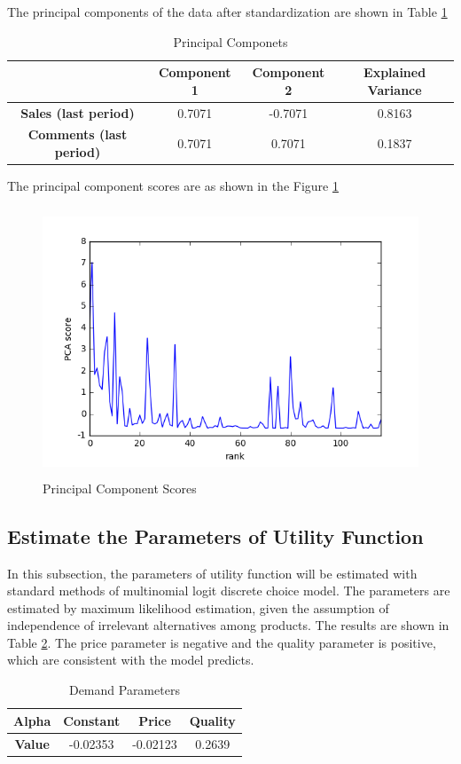 \documentclass{article}
\begin{document}
The principal components of the data after standardization are shown in Table \ref{pca}
\begin{table}[H]
\centering
\begin{tabular}{|c|c|c|c|}
\hline
&     \textbf{Component 1} &     \textbf{Component 2} &  \textbf{Explained Variance} \\
\hline
\textbf{Sales (last period)}    &  0.7071 & -0.7071 &            0.8163 \\
\hline
\textbf{Comments (last period)} &  0.7071 &  0.7071 &            0.1837 \\
\hline
\end{tabular}
\caption{\label{pca}Principal Componets}
\end{table}

The principal component scores are as shown in the Figure \ref{pca_scores}

\begin{figure}[H]
\centering
\includegraphics[width=12cm, height=8cm]{graphs/pca.png}
\caption{\label{pca_scores}Principal Component Scores}
\end{figure}


\subsection{Estimate the Parameters of Utility Function}
In this subsection, the parameters of utility function will be estimated with standard methods of multinomial logit discrete choice model. The parameters are estimated by maximum likelihood estimation, given the assumption of independence of irrelevant alternatives among products. The results are shown in Table \ref{alpha}. The price parameter is negative and the quality parameter is positive, which are consistent with the model predicts. 
\begin{table}[H]
\centering
\begin{tabular}{|c|c|c|c|}
\hline
\textbf{Alpha} & \textbf{Constant} & \textbf{Price} & \textbf{Quality} \\
\hline
\textbf{Value} & -0.02353 & -0.02123 & 0.2639 \\
\hline 
\end{tabular}
\caption{\label{alpha}Demand Parameters}
\end{table}
\end{document}
